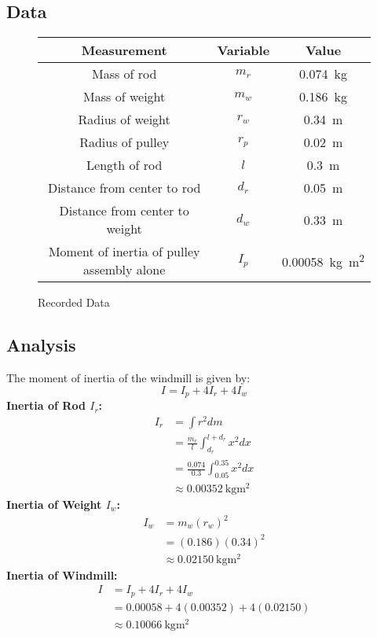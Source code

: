 \documentclass[article, 11pt]{article}
\begin{document}
    \subsection{Data}
    \begin{figure}[H]
        \begin{center}
            \begin{tabular}{|c|c|c|}
                \hline
                \textbf{Measurement} & \textbf{Variable} & \textbf{Value} \\
                \hline
                Mass of rod & $m_r$ & \SI{0.074}{\kilogram} \\
                Mass of weight & $m_w$ & \SI{0.186}{\kilogram} \\
                Radius of weight & $r_w$ & \SI{0.34}{\meter} \\
                Radius of pulley & $r_p$ & \SI{0.02}{\meter} \\
                Length of rod & $l$ & \SI{0.3}{\meter} \\
                Distance from center to rod & $d_r$ & \SI{0.05}{\meter} \\
                Distance from center to weight & $d_w$ & \SI{0.33}{\meter} \\
                Moment of inertia of pulley assembly alone & $I_p$ & \SI{0.00058}{\kilogram\meter^2} \\
                \hline
            \end{tabular}
        \end{center}
        \caption{Recorded Data}
    \end{figure}
    \subsection{Analysis}
    The moment of inertia of the windmill is given by:
    \begin{equation*}
        I = I_p + 4I_r + 4I_w 
    \end{equation*}
    \textbf{Inertia of Rod $I_r$:} 
    \begin{align*}
        I_r &= \int r^2 dm \\
            &= \frac{m_r}{l} \int_{d_r}^{l + d_r} {x^2 dx} \\
            &= \frac{0.074}{0.3} \int_{0.05}^{0.35} {x^2 dx} \\
            &\approx \SI{0.00352}{\kilogram\meter^2}
    \end{align*}
    \textbf{Inertia of Weight $I_w$:}
    \begin{align*}
        I_w &= m_w(r_w)^2 \\
            &= (0.186)(0.34)^2 \\
            &\approx \SI{0.02150}{\kilogram\meter^2}
    \end{align*}
    \textbf{Inertia of Windmill:}
    \begin{align*}
        I &= I_p + 4I_r + 4I_w \\
            &= 0.00058 + 4(0.00352) + 4(0.02150) \\
            &\approx \SI{0.10066}{\kilogram\meter^2}
    \end{align*}
\end{document}
